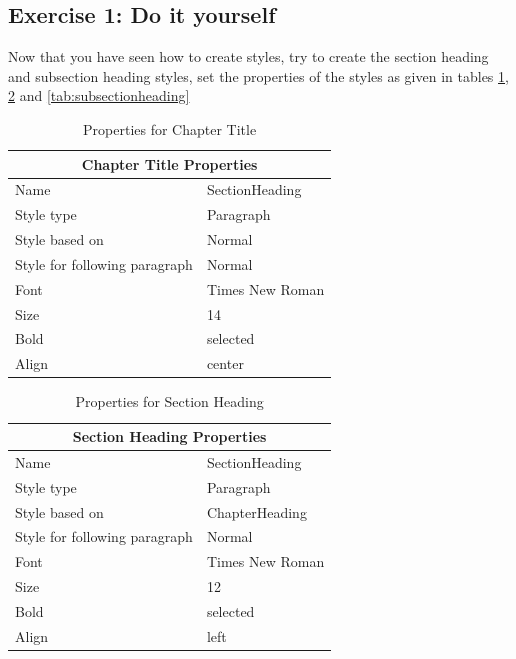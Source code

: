  \subsection{Exercise 1: Do it yourself} 
 Now that you have seen how to create styles, try to create the  section heading and subsection heading styles, set the properties of the styles as given in tables \ref{tab:chaptertitle}, \ref{tab:sectionheading} and \ref{tab:subsectionheading}
 \begin{table}
     \centering
     \begin{tabular}{l | l}
         \toprule
          \multicolumn{2}{c}{Chapter Title Properties} \\ \toprule
          Name & SectionHeading \\ 
          Style type & Paragraph \\
          Style based on & Normal \\
          Style for following paragraph & Normal \\
          Font & Times New Roman \\
          Size & 14 \\
          Bold & selected \\
          Align & center \\ \bottomrule
     \end{tabular}
     \caption{Properties for Chapter Title}
     \label{tab:chaptertitle}
 \end{table}
 \begin{table}
     \centering
     \begin{tabular}{l | l}
         \toprule
          \multicolumn{2}{c}{Section Heading Properties} \\ \toprule
          Name & SectionHeading \\ 
          Style type & Paragraph \\
          Style based on & ChapterHeading \\
          Style for following paragraph & Normal \\
          Font & Times New Roman \\
          Size & 12 \\
          Bold & selected \\
          Align & left \\ \bottomrule
     \end{tabular}
     \caption{Properties for Section Heading}
     \label{tab:sectionheading}
 \end{table}
